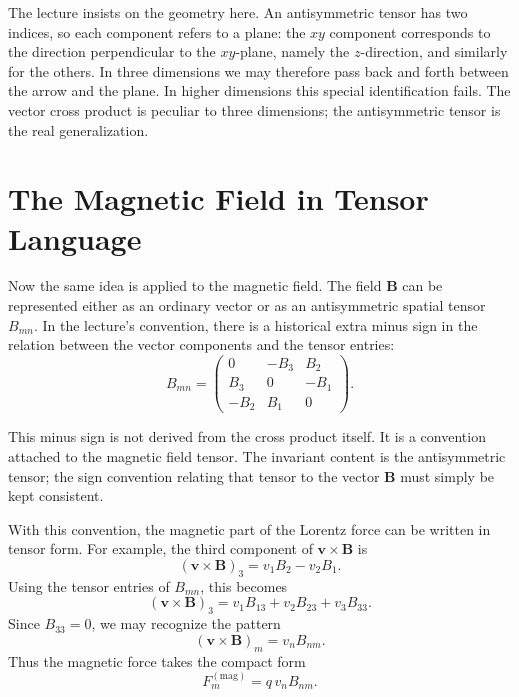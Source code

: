 The lecture insists on the geometry here. An antisymmetric tensor has two indices, so each component refers to a plane: the \(xy\) component corresponds to the direction perpendicular to the \(xy\)-plane, namely the \(z\)-direction, and similarly for the others. In three dimensions we may therefore pass back and forth between the arrow and the plane. In higher dimensions this special identification fails. The vector cross product is peculiar to three dimensions; the antisymmetric tensor is the real generalization.

\section{The Magnetic Field in Tensor Language}

Now the same idea is applied to the magnetic field. The field \(\mathbf B\) can be represented either as an ordinary vector or as an antisymmetric spatial tensor \(B_{mn}\). In the lecture's convention, there is a historical extra minus sign in the relation between the vector components and the tensor entries:
\begin{equation}
B_{mn}
=
\begin{pmatrix}
0 & -B_3 & B_2 \\
B_3 & 0 & -B_1 \\
-B_2 & B_1 & 0
\end{pmatrix}.
\end{equation}

\begin{remark}
This minus sign is not derived from the cross product itself. It is a convention attached to the magnetic field tensor. The invariant content is the antisymmetric tensor; the sign convention relating that tensor to the vector \(\mathbf B\) must simply be kept consistent.
\end{remark}

With this convention, the magnetic part of the Lorentz force can be written in tensor form. For example, the third component of \(\mathbf v\times\mathbf B\) is
\begin{equation}
(\mathbf v\times \mathbf B)_3 = v_1B_2-v_2B_1.
\end{equation}
Using the tensor entries of \(B_{mn}\), this becomes
\begin{equation}
(\mathbf v\times \mathbf B)_3 = v_1 B_{13}+v_2 B_{23}+v_3 B_{33}.
\end{equation}
Since \(B_{33}=0\), we may recognize the pattern
\begin{equation}
(\mathbf v\times \mathbf B)_m = v_n B_{nm}.
\end{equation}
Thus the magnetic force takes the compact form
\begin{equation}
F_m^{(\mathrm{mag})}=q\,v_n B_{nm}.
\end{equation}

